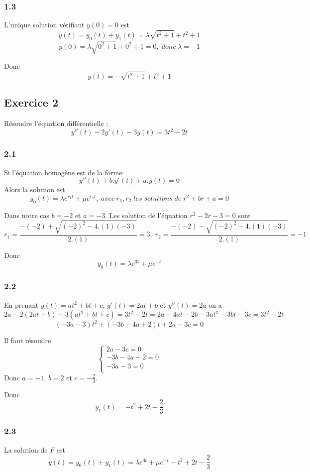 \documentclass[]{book}
\theoremstyle{definition}
\begin{document}
\subsubsection*{1.3}
L'unique solution v\'erifiant $y(0)= 0$ est
$$y(t) = y_0(t) + y_1(t) = \lambda\sqrt{t^2+1} + t^2+1$$
$$y(0) = \lambda\sqrt{0^2+1} + 0^2+1 = 0,\; donc\; \lambda = -1$$

Donc
$$y(t) = -\sqrt{t^2+1} + t^2+1$$

\subsection*{Exercice 2}
R\'esoudre l'\'equation diff\'erentielle :
$$y''(t) - 2y'(t) -3y(t)= 3t^2 - 2t$$

\subsubsection*{2.1}
Si l'\'equation homog\`ene est de la forme:
$$y''(t) +b.y'(t) + a.y(t) = 0$$
Alors la solution est
$$y_0(t) = \lambda e^{r_1 t} + \mu e^{r_2 t},\; avec\; r_1, r_2\; les\; solutions\; de\; r^2 + br + a = 0$$

Dans notre cas $b = -2$ et $a = -3$. Les solution de l'\'equation $r^2 - 2r - 3 = 0$ sont
$$r_1 = \frac{-(-2)+\sqrt{(-2)^2-4.(1)(-3)}}{2.(1)} = 3,\; r_2 = \frac{-(-2)-\sqrt{(-2)^2-4.(1)(-3)}}{2.(1)} = -1$$

Donc
$$y_0(t) = \lambda e^{3t} + \mu e^{-t}$$

\subsubsection*{2.2}
En prenant $y(t) = at^2 + bt + c$, $y'(t) = 2at+b$ et $y''(t) = 2a$ on a
$$2a - 2(2at+b) -3(at^2+bt+c) = 3t^2 - 2t = 2a -4at -2b -3at^2 -3bt -3c = 3t^2 - 2t$$
$$(-3a - 3)t^2 + (-3b -4a +2)t + 2a - 3c = 0$$

Il faut r\'esoudre
$$
\left\{ 
\begin{array}{l}
 2a - 3c = 0\\
 -3b -4a + 2 = 0\\
 -3a - 3 = 0\\
\end{array}
\right. 
$$
Donc $a=-1$, $b=2$ et $c=-\frac{2}{3}$.

Donc 
$$y_1(t) = -t^2 + 2t -\frac{2}{3}$$

\subsubsection*{2.3}
La solution de $F$ est
$$y(t) = y_0(t) + y_1(t) = \lambda e^{3t} + \mu e^{-t} -t^2 + 2t -\frac{2}{3}$$
\end{document}
